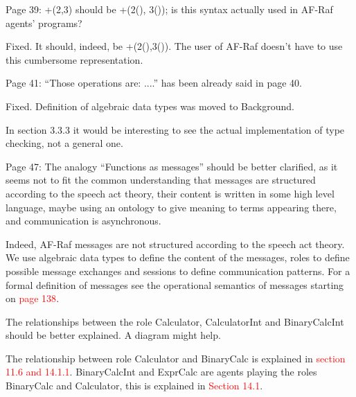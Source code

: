 \documentclass{article}
\newcommand*\R[1]{\textcolor{red}{#1}} %
\newcommand{\todo}[1]{[\textcolor{green}{TODO}: #1]}
\newenvironment{them}{\noindent\begingroup\color{blue}}{\endgroup\par}
\begin{document}
\begin{them}

Page 39:
+(2,3) should be +(2(), 3()); is this syntax actually used in AF-Raf agents'
programs?

\end{them}

Fixed. It should, indeed, be +(2(),3()). The user of AF-Raf doesn't have to use
this cumbersome representation.

\begin{them}

Page 41:
“Those operations are: ....” has been already said in page 40.
\end{them}

Fixed. Definition of algebraic data types was moved to Background.

\begin{them}

In section 3.3.3 it would be interesting to see the actual implementation of
type checking, not a general one.

\end{them}
\todo{Implement the type checker}

\begin{them}

Page 47:
The analogy “Functions as messages” should be better clarified, as it seems not
to fit the common understanding that messages are structured according to the
speech act theory, their content is written in some high level language, maybe
using an ontology to give meaning to terms appearing there, and communication
is asynchronous.

\end{them}
Indeed, AF-Raf messages are not structured according to  the speech act
theory.  We use algebraic data types to define the content of the messages,
roles to define possible message exchanges and sessions to define communication
patterns. For a formal definition of messages see the operational semantics of
messages starting on \R{page 138}.

\begin{them}

The relationships between the role Calculator, CalculatorInt and BinaryCalcInt
should be better explained. A diagram might help.

\end{them}
The relationship between role Calculator and BinaryCalc is explained in
\R{section 11.6 and 14.1.1}. BinaryCalcInt and ExprCalc are agents playing the
roles BinaryCalc and Calculator, this is explained in \R{Section 14.1}.
\end{document}
